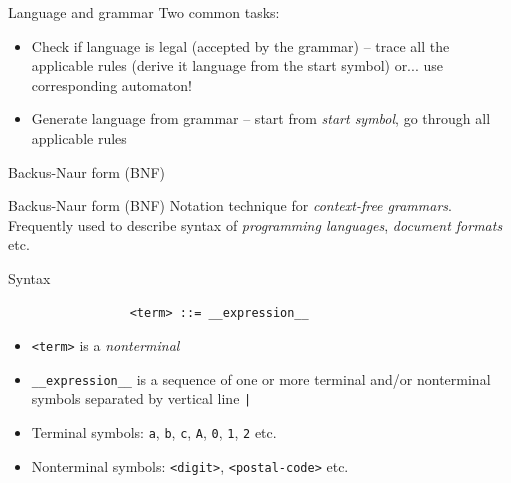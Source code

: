 \documentclass{beamer}
\begin{document}
\begin{frame}{Language and grammar}
Two common tasks:

\begin{itemize}
	\item Check if language is legal (accepted by the grammar) -- trace all the applicable rules (derive it language from the start symbol) or... use corresponding automaton!
	\item Generate language from grammar -- start from \textit{start symbol}, go through all applicable rules
\end{itemize}
\end{frame}

\begin{frame}[fragile]{Backus-Naur form (BNF)}

\begin{block}{Backus-Naur form (BNF)}
Notation technique for \textit{context-free grammars}. Frequently used to describe syntax of \textit{programming languages}, \textit{document formats} etc.
\end{block}


\begin{block}{Syntax}
\begin{verbatim}
                 <term> ::= __expression__
\end{verbatim}
\vskip -0.5cm
\begin{itemize}
\item \verb|<term>| is a \textit{nonterminal}
\item \verb|__expression__| is a sequence of one or more terminal and/or nonterminal symbols separated by vertical line \verb$|$
\item Terminal symbols: \verb|a|, \verb|b|, \verb|c|, \verb|A|, \verb|0|, \verb|1|, \verb|2| etc.
\item Nonterminal symbols: \verb|<digit>|, \verb|<postal-code>| etc.
\end{itemize}
\end{block}

\end{frame}
\end{document}
